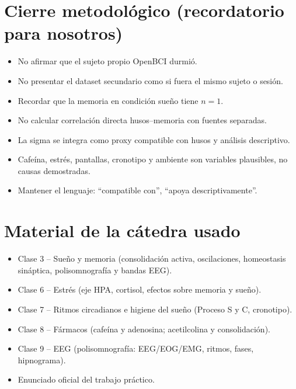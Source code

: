\documentclass[11pt,a4paper]{article}
\begin{document}
\section{Cierre metodológico (recordatorio para nosotros)}
\begin{itemize}[leftmargin=1.5em]
  \item No afirmar que el sujeto propio OpenBCI durmió.
  \item No presentar el dataset secundario como si fuera el mismo sujeto o sesión.
  \item Recordar que la memoria en condición sueño tiene $n=1$.
  \item No calcular correlación directa husos--memoria con fuentes separadas.
  \item La sigma se integra como proxy compatible con husos y análisis descriptivo.
  \item Cafeína, estrés, pantallas, cronotipo y ambiente son variables plausibles, no causas
        demostradas.
  \item Mantener el lenguaje: ``compatible con'', ``apoya descriptivamente''.
\end{itemize}

\section{Material de la cátedra usado}
\begin{itemize}
  \item Clase 3 -- Sueño y memoria (consolidación activa, oscilaciones, homeostasis sináptica,
        polisomnografía y bandas EEG).
  \item Clase 6 -- Estrés (eje HPA, cortisol, efectos sobre memoria y sueño).
  \item Clase 7 -- Ritmos circadianos e higiene del sueño (Proceso S y C, cronotipo).
  \item Clase 8 -- Fármacos (cafeína y adenosina; acetilcolina y consolidación).
  \item Clase 9 -- EEG (polisomnografía: EEG/EOG/EMG, ritmos, fases, hipnograma).
  \item Enunciado oficial del trabajo práctico.
\end{itemize}
\end{document}
